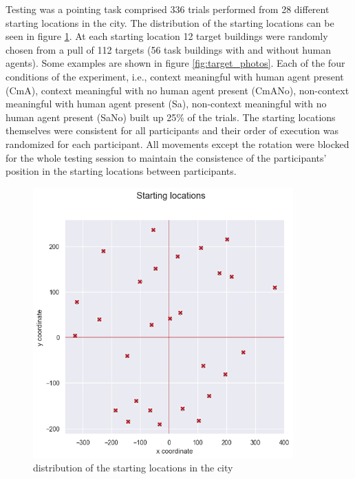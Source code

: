 Testing was a pointing task comprised 336 trials performed from 28 different starting locations in the city. The distribution of the starting locations can be seen in figure \ref{fig:starting_locs}. At each starting location 12 target buildings were randomly chosen from a pull of 112 targets (56 task buildings with and without human agents). Some examples are shown in figure \ref{fig:target_photos}. Each of the four conditions of the experiment, i.e., context meaningful with human agent present {\emphasize(CmA)}, context meaningful with no human agent present {\emphasize(CmANo)}, non-context meaningful with human agent present {\emphasize(Sa)}, non-context meaningful with no human agent present {\emphasize(SaNo)} built up 25\% of the trials.  The starting locations themselves were consistent for all participants and their order of execution was randomized for each participant. All movements except the rotation were blocked for the whole testing session to maintain the consistence of the participants' position in the starting locations between participants. \\


\begin{figure}[h]
	\centering
	\includegraphics[width=100mm]{figures/starting_locations.png}
	\caption[Distribution of starting locations]{distribution of the starting locations in the city}
	\label{fig:starting_locs}
\end{figure}



